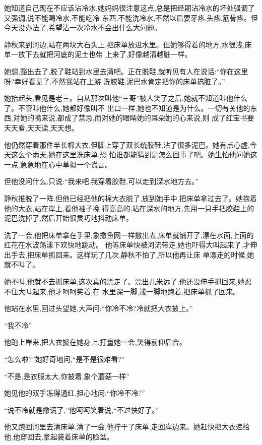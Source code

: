 ﻿\documentclass[12pt]{article}
\begin{document}
她知道自己现在不应该沾冷水,她妈妈很注意这点,总是把经期沾冷水的坏处强调了又强调,说不能喝冷水,不能吃冷
东西,不能洗冷水,不然以后要牙疼,头疼,筋骨疼。但今天没办法了,希望沾一次冷水不会出什么大问题。

静秋来到河边,站在两块大石头上,把床单放进水里。但她够得着的地方,水很浅,床单一放下去就把河底的泥土也带
上来了,好像越清越脏一样。

她想,豁出去了,脱了鞋站到水里去清吧。正在脱鞋,就听见有人在说话:``你在这里呀?幸好看见了,不然我站在上游
洗胶鞋,泥巴水肯定把你的床单搞脏了。''

她抬起头,看见是老三。自从那次叫他``三哥''被人笑了之后,她就不知道叫他什么了。不管叫他什么,她都好像叫不
出口一样,她也不知道是为什么。一切有关他的东西,对她的嘴来说,都成了禁忌,而对她的眼睛她的耳朵她的心来说,则
成了红宝书\myrule 要天天看,天天读,天天想。

他仍然穿着那件半长棉大衣,但脚上穿了双长统胶鞋,沾了很多泥巴。她有点心虚,今天这么个雨天,她在这里洗床单,恐
怕谁都能猜到是怎么回事了吧。她生怕他问她这一点,急急地在心中草拟一个谎言。

但他没问什么,只说:``我来吧,我穿着胶鞋,可以走到深水地方去。''

静秋推脱了一阵,但他已经把他的棉大衣脱了,放到她手中,把床单拿过去了。她抱着他的大衣,站在岸上,看他袖子挽
得高高的,站在深水的地方,先用一只手把胶鞋上的泥巴洗掉了,然后开始很灵巧地抖动床单。

洗了一会,他把床单拿在手里,象撒鱼网一样撒出去,床单就铺开了,漂在水面,上面的红花在水波荡漾下欢快地跳动。
他等床单快被河流带走,她也吓得大叫起来了,才伸出手去,把床单抓回来。这样玩了几次,静秋不怕了,所以他再让床
单漂走的时候,她就不叫了。

她不叫,他就不去抓床单,这次真的漂走了。漂出几米远了,他还没伸手抓回来,她忍不住大叫起来,他才呵呵笑着,在
水里深一脚,浅一脚地跑着,把床单抓了回来。

他站在水里,回过头望她,大声问:``你冷不冷?冷就把大衣披上。''

``我不冷\myrule ''

他跑上岸来,把大衣披在她身上,打量她一会,笑得前仰后合。

``怎么啦?''她好奇地问,``是不是\myrule 很难看?''

``不是,是衣服太大,你披着,象个蘑菇一样\myrule ''

她见他的双手冻得通红,担心地问:``你\myrule 冷不冷?''

``说不冷就是撒谎了,''他呵呵笑着说,``不过快好了。''

他又跑回河里去清床单,清了一会,他拧干了床单,走回岸边来。她赶快把大衣递给他,他穿回去,拿起装着床单的脸盆。
\end{document}
